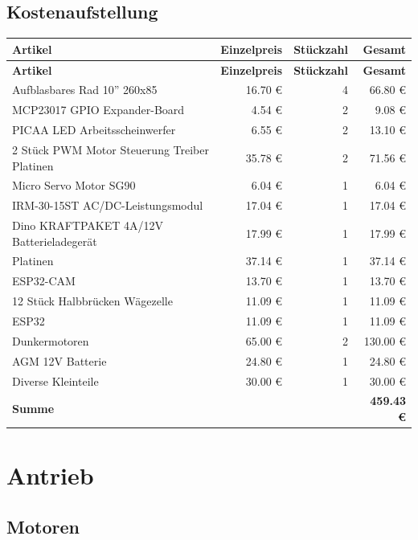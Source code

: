 \documentclass[ngerman,12pt,a4paper]{article}
\begin{document}
		\subsection{Kostenaufstellung} %
			\begin{center}
				\begin{longtable}{| p{8.2cm} | r | r | r |}
					\hline
					\textbf{Artikel} & \textbf{Einzelpreis} & \textbf{Stückzahl} & \textbf{Gesamt} \\
					\hline
					\endfirsthead
					\hline
					\textbf{Artikel} & \textbf{Einzelpreis} & \textbf{Stückzahl} & \textbf{Gesamt} \\
					\hline
					\endhead
					\hline
					Aufblasbares Rad 10'' 260x85  & 16.70 € & 4 & 66.80 € \\ \hline
					MCP23017 GPIO Expander-Board & 4.54 € & 2 & 9.08 € \\ \hline
					PICAA LED Arbeitsscheinwerfer & 6.55 € & 2 & 13.10 € \\ \hline
					2 Stück PWM Motor Steuerung Treiber Platinen & 35.78 € & 2 & 71.56 € \\ \hline
					Micro Servo Motor SG90 & 6.04 € & 1 & 6.04 € \\ \hline
					IRM-30-15ST AC/DC-Leistungsmodul & 17.04 € & 1 & 17.04 € \\ \hline
					Dino KRAFTPAKET 4A/12V Batterieladegerät & 17.99 € & 1 & 17.99 € \\ \hline
					Platinen & 37.14 € & 1 & 37.14 € \\ \hline
					ESP32-CAM & 13.70 € & 1 & 13.70 € \\ \hline
					12 Stück Halbbrücken Wägezelle & 11.09 € & 1 & 11.09 € \\ \hline
					ESP32 & 11.09 € & 1 & 11.09 € \\ \hline
					Dunkermotoren & 65.00 € & 2 & 130.00 € \\ \hline
					AGM 12V Batterie & 24.80 € & 1 & 24.80 € \\ \hline
					Diverse Kleinteile & 30.00 € & 1 & 30.00 € \\ \hline
					\textbf{Summe} & & & \textbf{459.43 €} \\
					\hline
				\end{longtable}
			\end{center}
			\newpage
	\section{Antrieb}
	
		\subsection{Motoren} %
		
\end{document}
